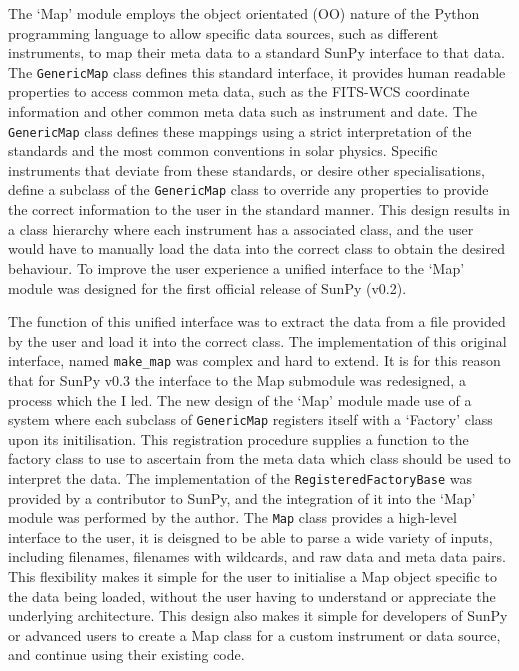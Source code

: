 The `Map' module employs the object orientated (OO) nature of the Python programming language to allow specific data sources, such as different instruments, to map their meta data to a standard SunPy interface to that data.
The \verb|GenericMap| class defines this standard interface, it provides human readable properties to access common meta data, such as the FITS-WCS coordinate information and other common meta data such as instrument and date.
The \verb|GenericMap| class defines these mappings using a strict interpretation of the standards and the most common conventions in solar physics.
Specific instruments that deviate from these standards, or desire other specialisations, define a subclass of the \verb|GenericMap| class to override any properties to provide the correct information to the user in the standard manner.
This design results in a class hierarchy where each instrument has a associated class, and the user would have to manually load the data into the correct class to obtain the desired behaviour.
To improve the user experience a unified interface to the `Map' module was designed for the first official release of SunPy (v0.2).

The function of this unified interface was to extract the data from a file provided by the user and load it into the correct class.
The implementation of this original interface, named \verb|make_map| was complex and hard to extend.
It is for this reason that for SunPy v0.3 the interface to the Map submodule was redesigned, a process which the I led.
The new design of the `Map' module made use of a system where each subclass of \verb|GenericMap| registers itself with a `Factory' class upon its initilisation.
This registration procedure supplies a function to the factory class to use to ascertain from the meta data which class should be used to interpret the data.
The implementation of the \verb|RegisteredFactoryBase| was provided by a contributor to SunPy, and the integration of it into the `Map' module was performed by the author.
The \verb|Map| class provides a high-level interface to the user, it is deisgned to be able to parse a wide variety of inputs, including filenames, filenames with wildcards, and raw data and meta data pairs.
This flexibility makes it simple for the user to initialise a Map object specific to the data being loaded, without the user having to understand or appreciate the underlying architecture.
This design also makes it simple for developers of SunPy or advanced users to create a Map class for a custom instrument or data source, and continue using their existing code.

